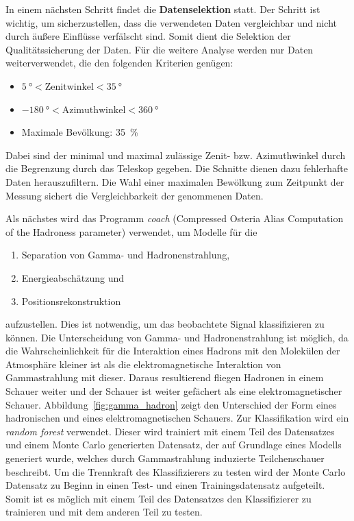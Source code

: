 In einem nächsten Schritt findet die \textbf{Datenselektion} statt. Der Schritt
ist wichtig, um sicherzustellen, dass die verwendeten Daten vergleichbar und
nicht durch äußere Einflüsse verfälscht sind. Somit dient die Selektion der
Qualitätssicherung der Daten. Für die weitere Analyse werden nur Daten
weiterverwendet, die den folgenden Kriterien genügen:
\begin{itemize}
  \item $\SI{5}{\degree}<\text{Zenitwinkel}<\SI{35}{\degree}$
  \item $\SI{-180}{\degree}<\text{Azimuthwinkel}<\SI{360}{\degree}$
  \item Maximale Bevölkung: \SI{35}{\percent}
\end{itemize}
Dabei sind der minimal und maximal zulässige Zenit- bzw. Azimuthwinkel durch die
Begrenzung durch das Teleskop gegeben. Die Schnitte dienen dazu fehlerhafte
Daten herauszufiltern. Die Wahl einer maximalen Bewölkung zum Zeitpunkt der
Messung sichert die Vergleichbarkeit der genommenen Daten.

Als nächstes wird das Programm \textit{coach} (Compressed Osteria Alias
Computation of the Hadroness parameter) verwendet, um Modelle für die
\begin{enumerate}
  \item Separation von Gamma- und Hadronenstrahlung,
  \item Energieabschätzung und
  \item Positionsrekonstruktion
\end{enumerate}
aufzustellen. Dies ist notwendig, um das beobachtete Signal klassifizieren zu
können. Die Unterscheidung von Gamma- und Hadronenstrahlung ist möglich, da die
Wahrscheinlichkeit für die Interaktion eines Hadrons mit den Molekülen der
Atmosphäre kleiner ist als die elektromagnetische Interaktion von Gammastrahlung
mit dieser. Daraus resultierend fliegen Hadronen in einem Schauer weiter und der
Schauer ist weiter gefächert als eine elektromagnetischer Schauer.
Abbildung~\ref{fig:gamma_hadron} zeigt den Unterschied der Form eines
hadronischen und eines elektromagnetischen Schauers. Zur Klassifikation wird ein
\textit{random forest} verwendet. Dieser wird trainiert mit einem Teil des
Datensatzes und einem Monte Carlo generierten Datensatz, der auf Grundlage eines
Modells generiert wurde, welches durch Gammastrahlung induzierte Teilchenschauer
beschreibt. Um die Trennkraft des Klassifizierers zu testen wird der Monte
Carlo Datensatz zu Beginn in einen Test- und einen Trainingsdatensatz
aufgeteilt. Somit ist es möglich mit einem Teil des Datensatzes den
Klassifizierer zu trainieren und mit dem anderen Teil zu testen.

